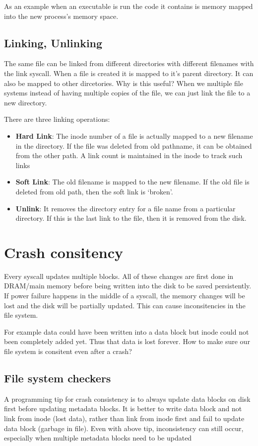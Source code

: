 \documentclass[12pt]{article}
\begin{document}
As an example when an executable is run the code it contains is memory mapped into the new process's memory space. 

\subsection{Linking, Unlinking}

The same file can be linked from different directories with different filenames with the link syscall. When a file is created it is mapped to it's parent directory. It can also be mapped to other dircetories. 
Why is this useful? When we multiple file systems instead of having multiple copies of the file, we can just link the file to a new directory. 

There are three linking operations:
\begin{itemize}
    \item \textbf{Hard Link}: The inode number of a file is actually mapped to a new filename in the directory. If the file was deleted from old pathname, it can be obtained from the other path. A link count is maintained in the inode to track such links
    \item \textbf{Soft Link}: The old filename is mapped to the new filename. If the old file is deleted from old path, then the soft link is `broken'.
    \item \textbf{Unlink}: It removes the directory entry for a file name from a particular directory. If this is the last link to the file, then it is removed from the disk. 
\end{itemize}



\section{Crash consitency}
Every syscall updates multiple blocks. All of these changes are first done in DRAM/main memory before being written into the disk to be saved persistently. If power failure happens in the middle of a syscall, the memory changes will be lost and the disk will be partially updated. 
This can cause inconsitencies in the file system.

For example data could have been written into a data block but inode could not been completely added yet. Thus that data is lost forever. How to make sure our file system is consitent even after a crash?



\subsection{File system checkers}
A programming tip for crash consistency is to always update data blocks on disk first
before updating metadata blocks. It is better to write data block and not link from inode (lost data), rather than link from inode first
and fail to update data block (garbage in file). Even with above tip, inconsistency can still occur, especially when multiple
metadata blocks need to be updated
\end{document}
